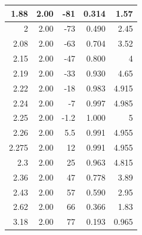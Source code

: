 \documentclass[UTF8]{article}
\begin{document}
\begin{enumerate}
\begin{table}[H]
\begin{tabular}{|r|r|r|r|r|}
            1.88   & 2.00   & -81    & 0.314  & 1.57 \\\hline
            2      & 2.00   & -73    & 0.490  & 2.45 \\\hline
            2.08   & 2.00   & -63    & 0.704  & 3.52 \\\hline
            2.15   & 2.00   & -47    & 0.800  & 4 \\\hline
            2.19   & 2.00   & -33    & 0.930  & 4.65 \\\hline
            2.22   & 2.00   & -18    & 0.983  & 4.915 \\\hline
            2.24   & 2.00   & -7     & 0.997  & 4.985 \\\hline
            2.25   & 2.00   & -1.2   & 1.000  & 5 \\\hline
            2.26   & 2.00   & 5.5    & 0.991  & 4.955 \\\hline
            2.275  & 2.00   & 12     & 0.991  & 4.955 \\\hline
            2.3    & 2.00   & 25     & 0.963  & 4.815 \\\hline
            2.36   & 2.00   & 47     & 0.778  & 3.89 \\\hline
            2.43   & 2.00   & 57     & 0.590  & 2.95 \\\hline
            2.62   & 2.00   & 66     & 0.366  & 1.83 \\\hline
            3.18   & 2.00   & 77     & 0.193  & 0.965 \\\hline


\end{tabular}
\end{table}
\end{enumerate}
\end{document}
